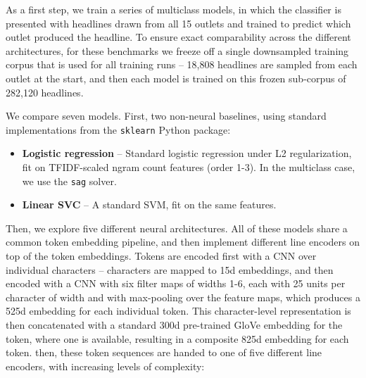 \documentclass{scrartcl}
\begin{document}
As a first step, we train a series of multiclass models, in which the classifier is presented with headlines drawn from all 15 outlets and trained to predict which outlet produced the headline. To ensure exact comparability across the different architectures, for these benchmarks we freeze off a single downsampled training corpus that is used for all training runs -- 18,808 headlines are sampled from each outlet at the start, and then each model is trained on this frozen sub-corpus of 282,120 headlines.

We compare seven models. First, two non-neural baselines, using standard implementations from the \texttt{sklearn}\cite{scikit-learn} Python package:

\begin{itemize}
\item \textbf{Logistic regression} -- Standard logistic regression under L2 regularization, fit on TFIDF-scaled ngram count features (order 1-3). In the multiclass case, we use the \texttt{sag} solver.

\item \textbf{Linear SVC} -- A standard SVM, fit on the same features.
\end{itemize}

Then, we explore five different neural architectures. All of these models share a common token embedding pipeline, and then implement different line encoders on top of the token embeddings. Tokens are encoded first with a CNN over individual characters -- characters are mapped to 15d embeddings, and then encoded with a CNN with six filter maps of widths 1-6, each with 25 units per character of width and with max-pooling over the feature maps, which produces a 525d embedding for each individual token. This character-level representation is then concatenated with a standard 300d pre-trained GloVe embedding for the token, where one is available, resulting in a composite 825d embedding for each token. then, these token sequences are handed to one of five different line encoders, with increasing levels of complexity:
\end{document}
